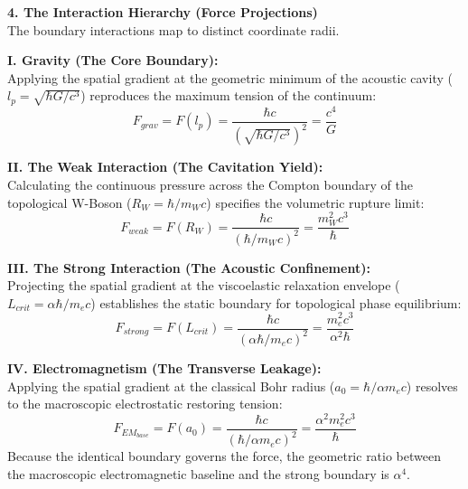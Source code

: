 \vspace{0.2 cm}

\textbf{4. The Interaction Hierarchy (Force Projections)} \\
The boundary interactions map to distinct coordinate radii.

\textbf{I. Gravity (The Core Boundary):} \\
Applying the spatial gradient at the geometric minimum of the acoustic cavity ($l_p = \sqrt{\hbar G / c^3}$) reproduces the maximum tension of the continuum: 
\begin{equation}
    F_{grav} = F(l_p) = \frac{\hbar c}{(\sqrt{\hbar G / c^3})^2} = \frac{c^4}{G}
\end{equation}

\textbf{II. The Weak Interaction (The Cavitation Yield):} \\
Calculating the continuous pressure across the Compton boundary of the topological W-Boson ($R_W = \hbar / m_W c$) specifies the volumetric rupture limit: 
\begin{equation}
    F_{weak} = F(R_W) = \frac{\hbar c}{(\hbar / m_W c)^2} = \frac{m_W^2 c^3}{\hbar}
\end{equation}

\textbf{III. The Strong Interaction (The Acoustic Confinement):} \\
Projecting the spatial gradient at the viscoelastic relaxation envelope ($L_{crit} = \alpha \hbar / m_e c$) establishes the static boundary for topological phase equilibrium: 
\begin{equation}
    F_{strong} = F(L_{crit}) = \frac{\hbar c}{(\alpha \hbar / m_e c)^2} = \frac{m_e^2 c^3}{\alpha^2 \hbar}
\end{equation}

\textbf{IV. Electromagnetism (The Transverse Leakage):} \\
Applying the spatial gradient at the classical Bohr radius ($a_0 = \hbar / \alpha m_e c$) resolves to the macroscopic electrostatic restoring tension:
\begin{equation}
    F_{EM_{base}} = F(a_0) = \frac{\hbar c}{(\hbar / \alpha m_e c)^2} = \frac{\alpha^2 m_e^2 c^3}{\hbar}
\end{equation}
Because the identical boundary governs the force, the geometric ratio between the macroscopic electromagnetic baseline and the strong boundary is $\alpha^4$.

\vspace{0.2 cm}

